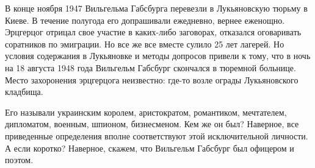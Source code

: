 В конце ноября 1947 Вильгельма Габсбурга перевезли в Лукьяновскую тюрьму в
Киеве. В течение полугода его допрашивали ежедневно, вернее еженощно. Эрцгерцог
отрицал свое участие в каких-либо заговорах, отказался оговаривать соратников
по эмиграции. Но все же все вместе сулило 25 лет лагерей. Но условия содержания
в Лукьяновке и методы допросов привели к тому, что в ночь на 18 августа 1948
года Вильгельм Габсбург скончался в тюремной больнице. Место захоронения
эрцгерцога неизвестно: где-то возле ограды Лукьяновского кладбища.   

Его называли украинским королем, аристократом, романтиком, мечтателем,
дипломатом, военным, шпионом, бизнесменом. Кем же он был? Наверное, все
приведенные определения вполне соответствуют этой исключительной личности. А
если коротко? Наверное, скажем, что Вильгельм Габсбург был офицером и поэтом.

